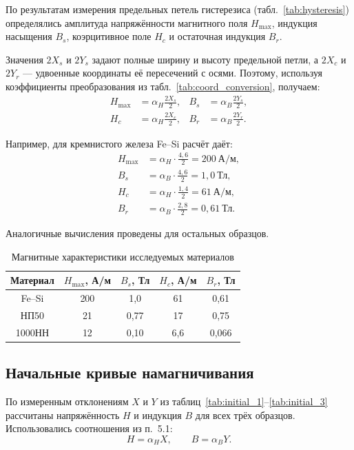 \documentclass[12pt,a4paper]{article}
\begin{document}
По результатам измерения предельных петель гистерезиса
(табл.~\ref{tab:hysteresis}) определялись амплитуда напряжённости
магнитного поля $H_{\max}$, индукция насыщения $B_s$,
коэрцитивное поле $H_c$ и остаточная индукция $B_r$.

Значения $2X_s$ и $2Y_s$ задают полные ширину и высоту
предельной петли, а $2X_c$ и $2Y_r$ --- удвоенные координаты
её пересечений с осями. Поэтому, используя коэффициенты
преобразования из табл.~\ref{tab:coord_conversion}, получаем:
\begin{align}
 H_{\max}&=\alpha_H\frac{2X_s}{2}, &
 B_s&=\alpha_B\frac{2Y_s}{2}, \label{eq:saturation_params}\\
 H_c&=\alpha_H\frac{2X_c}{2}, &
 B_r&=\alpha_B\frac{2Y_r}{2}. \label{eq:remanence_params}
\end{align}

Например, для кремнистого железа Fe--Si расчёт даёт:
\begin{align*}
 H_{\max}&=\alpha_H\cdot\frac{4{,}6}{2}
             =200\ \text{А/м},\\
 B_s&=\alpha_B\cdot\frac{4{,}6}{2}
             =1{,}0\ \text{Тл},\\
 H_c&=\alpha_H\cdot\frac{1{,}4}{2}
             =61\ \text{А/м},\\
 B_r&=\alpha_B\cdot\frac{2{,}8}{2}
             =0{,}61\ \text{Тл}.
\end{align*}

Аналогичные вычисления проведены для остальных образцов.
\begin{table}[H]
  \centering
  \caption{Магнитные характеристики исследуемых материалов}
  \label{tab:results}
  \begin{tabular}{c c c c c}
    \toprule
    Материал & $H_{\max}$, А/м & $B_s$, Тл & $H_c$, А/м & $B_r$, Тл \\
    \midrule
    Fe--Si & 200 & 1,0 & 61 & 0,61 \\
    НП50 & 21 & 0,77 & 17 & 0,75 \\
    1000НН & 12 & 0,10 & 6,6 & 0,066 \\
    \bottomrule
  \end{tabular}
\end{table}

\subsection{Начальные кривые намагничивания}

По измеренным отклонениям $X$ и $Y$ из таблиц~\ref{tab:initial_1}--\ref{tab:initial_3}
рассчитаны напряжённость $H$ и индукция $B$ для всех трёх образцов.
Использовались соотношения из п.~5.1:
\begin{equation}
  H=\alpha_H X, \qquad B=\alpha_B Y.
\end{equation}
\end{document}
